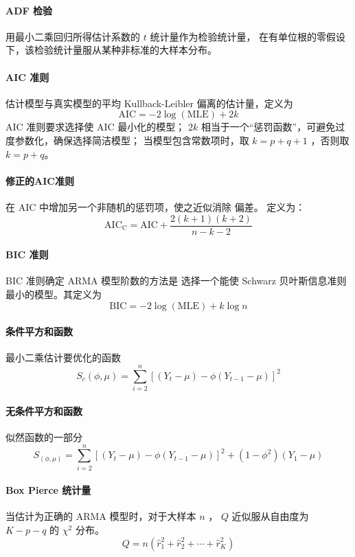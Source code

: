 \documentclass[UTF8,hyperref,a4paper,twoside]{ctexart}
\begin{document}
        \paragraph{ADF 检验} 用最小二乘回归所得估计系数的 $ t $ 统计量作为检验统计量，
        在有单位根的零假设下，该检验统计量服从某种非标准的大样本分布。

        \paragraph{AIC 准则} 估计模型与真实模型的平均 Kullback-Leibler 偏离的估计量，定义为
        $$ \mathrm{AIC} = -2 \log(\mathrm{MLE}) + 2k $$
        AIC 准则要求选择使 AIC 最小化的模型；
        $ 2k $ 相当于一个“惩罚函数”，可避免过度参数化，确保选择简洁模型；
        当模型包含常数项时，取 $ k = p + q + 1 $ ，否则取 $ k = p + q $。

        \paragraph{修正的AIC准则} 在 AIC 中增加另一个非随机的惩罚项，使之近似消除 偏差。
        定义为： $$ \mathrm{AIC_C} = \mathrm{AIC} + \frac{2(k+1)(k+2)}{n-k-2} $$

        \paragraph{BIC 准则} BIC 准则确定 ARMA 模型阶数的方法是
        选择一个能使 Schwarz 贝叶斯信息准则最小的模型。其定义为
        $$ \mathrm{BIC} = -2 \log(\mathrm{MLE}) + k \log{n} $$

        \paragraph{条件平方和函数} 最小二乘估计要优化的函数
        $$ S_c(ϕ, μ) = ∑ _{i=2}^{n} [(Y_t - μ) - ϕ (Y_{t-1} - μ)]^2 $$
        
        \paragraph{无条件平方和函数} 似然函数的一部分
        $$ S_(ϕ, μ) = ∑ _{i=2}^{n} [(Y_t - μ) - ϕ (Y_{t-1} - μ)]^2
                         + (1 - ϕ^2)(Y_1 - μ) $$
        
        \paragraph{Box Pierce 统计量} 当估计为正确的 ARMA 模型时，对于大样本 $ n $ ，
        $ Q $ 近似服从自由度为 $ K - p - q $ 的 $ \chi^2 $ 分布。
        $$ Q = n(\hat{r}_1^2 + \hat{r}_2^2 + ⋯ + \hat{r}_K^2) $$
\end{document}
